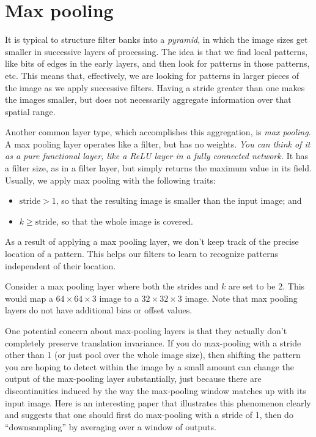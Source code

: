 \section{Max pooling}
It is typical  to structure
filter banks into a {\em pyramid}, in which the image sizes get
smaller in successive layers of processing.  The idea is  that we find
local patterns, like bits of edges in the early layers, and then look
for patterns  in those patterns, etc.   This means that, effectively,
we are looking for patterns in larger pieces of the image as we apply
successive filters.  Having a stride greater than one makes the images
smaller, but does not necessarily aggregate information over that
spatial range.

Another common layer type, which accomplishes this aggregation, is
  {\em max pooling}.
A max pooling layer operates like a filter, but has no weights. {\em
    You can think of it as a pure functional layer, like a ReLU layer in
    a fully connected network.}  It has a filter size, as in a filter
layer, but simply returns the maximum value in its field.
Usually, we
apply max pooling with the following traits:
\begin{itemize}
  \item $\text{stride} > 1$,  so that the resulting image is smaller
        than the input image; and
  \item $k \geq \text{stride}$, so that the whole image is covered.
\end{itemize}
As a result of applying a max pooling layer, we don't keep track of
the precise location of a pattern. This helps our filters to learn to
recognize patterns independent of their location.

Consider a max pooling layer where both the strides and $k$ are set to be 2. This would
map a $64 \times 64 \times 3$ image to a $32 \times 32 \times 3$
image. Note that max pooling layers do not have additional bias or
offset values.

One potential concern about max-pooling layers is that they
actually don't completely preserve translation invariance. If you do
max-pooling with a stride other than 1 (or just pool over the whole
image size), then shifting the pattern you are hoping to detect within
the image by a small amount can change the output of the max-pooling
layer substantially, just because there are discontinuities induced by
the way the max-pooling window matches up with its input image.
Here is an interesting paper 
that illustrates this phenomenon clearly
and suggests that one should first do max-pooling with a stride of 1,
then do ``downsampling'' by averaging over a window of outputs.


